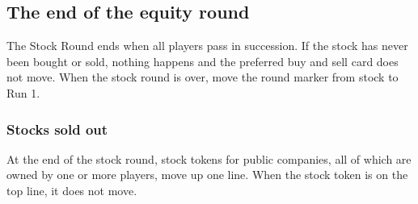 \documentclass{article}
\begin{document}
\begin{CJK}{UTF8}{min}
\subsection{The end of the equity round}
The Stock Round ends when all players pass in succession. If the stock
has never been bought or sold, nothing happens and the preferred buy
and sell card does not move. When the stock round is over, move the
round marker from stock to Run 1.

\subsubsection{Stocks sold out}
At the end of the stock round, stock tokens for public companies, all
of which are owned by one or more players, move up one line. When the
stock token is on the top line, it does not move.














\end{CJK}
\end{document}
